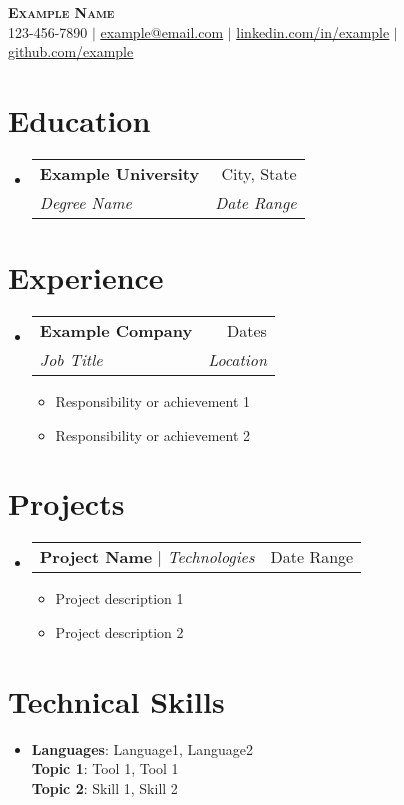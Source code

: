 \documentclass[letterpaper,11pt]{article}
\makeatletter
\newcommand{\resumeItem}[1]{
\item\small{
{#1 \vspace{-2pt}}
}
}
\newcommand{\resumeSubheading}[4]{
\vspace{-2pt}\item
\begin{tabular*}{0.97\textwidth}[t]{l@{\extracolsep{\fill}}r}
\textbf{#1} & #2 \\
\textit{\small#3} & \textit{\small #4} \\
\end{tabular*}\vspace{-7pt}
}
\newcommand{\resumeProjectHeading}[2]{
\item
\begin{tabular*}{0.97\textwidth}{l@{\extracolsep{\fill}}r}
\small#1 & #2 \\
\end{tabular*}\vspace{-7pt}
}
\newcommand{\resumeSubHeadingListStart}{\begin{itemize}[leftmargin=0.15in, label={}]}
\newcommand{\resumeSubHeadingListEnd}{\end{itemize}}
\newcommand{\resumeItemListStart}{\begin{itemize}}
\newcommand{\resumeItemListEnd}{\end{itemize}\vspace{-5pt}}
\makeatother
\begin{document}
\begin{center}
\textbf{\Huge \scshape Example Name} \\ \vspace{1pt}
\small 123-456-7890 $|$ \href{mailto:example@email.com}{\underline{example@email.com}} $|$
\href{https://linkedin.com/in/example}{\underline{linkedin.com/in/example}} $|$
\href{https://github.com/example}{\underline{github.com/example}}
\end{center}


\section{Education}
\resumeSubHeadingListStart
\resumeSubheading{Example University}{City, State}{Degree Name}{Date Range}
\resumeSubHeadingListEnd

\section{Experience}
\resumeSubHeadingListStart
\resumeSubheading{Example Company}{Dates}{Job Title}{Location}
\resumeItemListStart
\resumeItem{Responsibility or achievement 1}
\resumeItem{Responsibility or achievement 2}
\resumeItemListEnd
\resumeSubHeadingListEnd

\section{Projects}
\resumeSubHeadingListStart
\resumeProjectHeading{\textbf{Project Name} $|$ \emph{Technologies}}{Date Range}
\resumeItemListStart
\resumeItem{Project description 1}
\resumeItem{Project description 2}
\resumeItemListEnd
\resumeSubHeadingListEnd

\section{Technical Skills} %
\begin{itemize}[leftmargin=0.15in, label={}]
\item{
\textbf{Languages}{: Language1, Language2} \\
\textbf{Topic 1}{: Tool 1, Tool 1} \\
\textbf{Topic 2}{: Skill 1, Skill 2}
} \\
\end{itemize}


\end{document}
